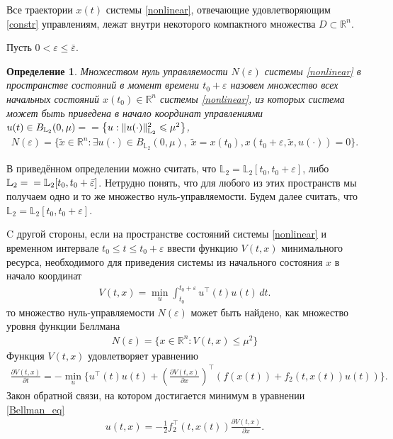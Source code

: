 \documentclass[12pt,a4paper,twoside]{article}  %
\newtheorem{df}{Определение}
\begin{document}
Все траектории $ x(t) $ системы \eqref{nonlinear}, отвечающие удовлетворяющим \eqref{constr} управлениям,  лежат внутри некоторого компактного множества $ D \subset \mathbb{R}^n $.

Пусть $ 0 <  \varepsilon \leqslant \bar{\varepsilon} $.
\begin{df}
	{\it Множеством нуль управляемости} $ N(\varepsilon) $ системы \eqref{nonlinear} в пространстве состояний в момент времени $ t_0 + \varepsilon $ назовем
	множество всех начальных состояний $ x(t_0) \in \mathbb{R}^n $ системы \eqref{nonlinear},  из которых система может быть приведена в начало координат управлениями
	$ u(t) \in B_{\mathbb{L}_2}(0,\mu) =\\ =\left\lbrace u:\lVert u(\cdot)\rVert^2_{\mathbb{L}_2} \leqslant \mu^2\right\rbrace  $,
	\begin{gather*}
		N(\varepsilon)=\{\widetilde{x}\in \mathbb{R}^n:\exists u(\cdot)\in B_{\mathbb{L}_2}(0,\mu),\; \widetilde{x}=x(t_0) , x(t_0 + \varepsilon,\widetilde{x},u(\cdot)) = 0\}.
	\end{gather*}
\end{df}

В приведённом определении можно считать, что $ \mathbb{L}_2 =\mathbb{L}_2[t_0,t_0+\varepsilon] $, либо  $ \mathbb{L}_2 =\\=\mathbb{L}_2[t_0,t_0+\bar{\varepsilon}] $. Нетрудно понять, что для любого из этих пространств мы получаем одно и то же множество нуль-управляемости. Будем далее считать, что $ \mathbb{L}_2 =\mathbb{L}_2[t_0,t_0+\varepsilon] $.

C другой стороны, если на пространстве состояний системы \eqref{nonlinear} и временном интервале $ t_0 \leqslant t \leqslant t_0 + \varepsilon $ ввести функцию $ V(t,x) $ минимального ресурса, необходимого для приведения системы из начального состояния $x$ в начало координат
\begin{gather}\label{Bellman_fun}
	V(t,x) = \min\limits_{u} \int_{t_0}^{t_0+\varepsilon} u^{\top}(t) u(t) \, dt.
\end{gather}
то множество нуль-управляемости $ N(\varepsilon) $ может быть найдено, как множество уровня функции Беллмана
\begin{gather*}
	N(\varepsilon)  = \{x \in \mathbb{R}^n: V(t,x) \leqslant \mu^2\}
\end{gather*}
Функция $V(t,x)$  удовлетворяет уравнению
\begin{gather}\label{Bellman_eq}
	\frac{\partial V(t,x)}{\partial t} = -\min\limits_{u} \{u^{\top}(t) u(t) + \left(\frac{\partial V(t,x)}{\partial x}\right)^{\top} \left(f(x(t))+f_2(t,x(t))u(t)\right) \}.
\end{gather}
Закон обратной связи, на котором достигается минимум в уравнении \eqref{Bellman_eq}
\begin{gather}\label{feedback}
	u(t,x) = -\frac{1}{2} f_2^{\top}(t,x(t))\frac{\partial V(t,x)}{\partial x}.
\end{gather}
\end{document}
